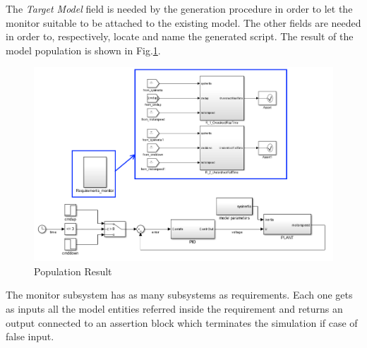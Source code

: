 The \textit{Target Model} field is needed by the generation procedure in order to let the monitor suitable to be attached to the existing model. The other fields are needed in order to, respectively, locate and name the generated script. The result of the model population is shown in Fig.\ref{fig:finalmodel}.

\begin{figure}[h]
\centering
\includegraphics[width=\textwidth]{Figs/finalmodel.png}
\caption{Population Result}
\label{fig:finalmodel}
\end{figure}

The monitor subsystem has as many subsystems as requirements. Each one gets as inputs all the model entities referred inside the requirement and returns an output connected to an assertion block which terminates the simulation if case of false input.

